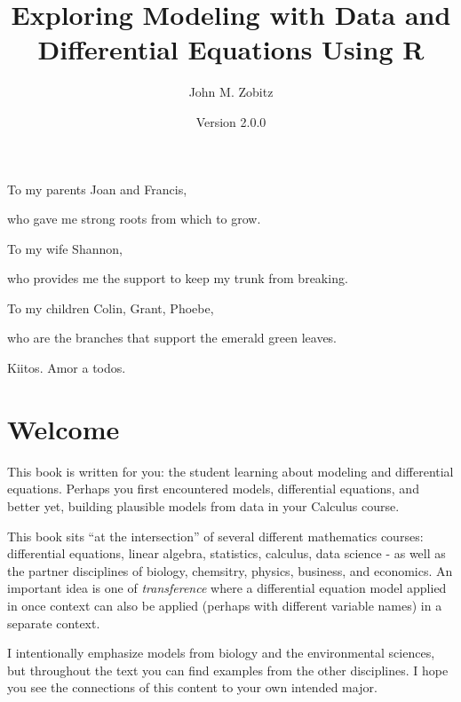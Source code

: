 \documentclass[
]{krantz}
\title{Exploring Modeling with Data and Differential Equations Using R}
\author{John M. Zobitz}
\date{Version 2.0.0}
\theoremstyle{definition}
\theoremstyle{definition}
\theoremstyle{definition}
\theoremstyle{definition}
\theoremstyle{remark}
\begin{document}
\maketitle


\thispagestyle{empty}

\begin{center}
To my parents Joan and Francis,

who gave me strong roots from which to grow.

To my wife Shannon,

who provides me the support to keep my trunk from breaking.

To my children Colin, Grant, Phoebe,

who are the branches that support the emerald green leaves.

Kiitos. Amor a todos.
\end{center}

\setlength{\abovedisplayskip}{-5pt}
\setlength{\abovedisplayshortskip}{-5pt}

{
\hypersetup{linkcolor=}
\setcounter{tocdepth}{1}
\tableofcontents
}
\listoftables
\listoffigures
\hypertarget{welcome}{%
\chapter*{Welcome}\label{welcome}}


This book is written for you: the student learning about modeling and differential equations. Perhaps you first encountered models, differential equations, and better yet, building plausible models from data in your Calculus course.

This book sits ``at the intersection'' of several different mathematics courses: differential equations, linear algebra, statistics, calculus, data science - as well as the partner disciplines of biology, chemsitry, physics, business, and economics. An important idea is one of \emph{transference} where a differential equation model applied in once context can also be applied (perhaps with different variable names) in a separate context.

I intentionally emphasize models from biology and the environmental sciences, but throughout the text you can find examples from the other disciplines. I hope you see the connections of this content to your own intended major.
\end{document}

